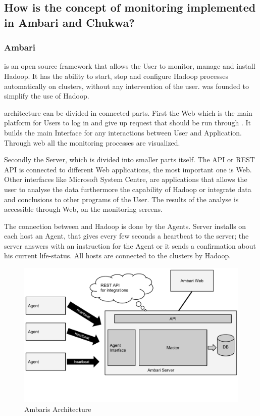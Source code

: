 \subsection{How is the concept of monitoring implemented in Ambari and Chukwa?}
\subsubsection{Ambari}
\amb is an open source framework that allows the User to monitor, manage and install Hadoop.\cite{ApacheSoftwareFoundation2015} It has the ability to start, stop and configure Hadoop processes automatically on clusters, without any intervention of the user.\cite{Hortonworks2013} \amb was founded to simplify the use of Hadoop.\cite{Hortonworks2013}

\amb architecture can be divided in connected parts. First the \amb Web which is the main platform for Users to log in and give up request that should be run through \amb.\cite{Sako} It builds the main Interface for any interactions between User and Application.\cite{Sako} Through \amb web all the monitoring processes are visualized. 

Secondly the \amb Server, which is divided into smaller parts itself.\cite{Sako} The API or REST API is connected to different Web applications, the most important one is \amb Web.\cite{Sako} Other interfaces like Microsoft System Centre, are applications that allows the user to analyse the data furthermore the capability of Hadoop or integrate data and conclusions to other programs of the User.\cite{Hortonworks2013} The results of the analyse is accessible through \amb Web, on the monitoring screens.\cite{Sako}

The connection between \amb and Hadoop is done by the \amb Agents.\cite{Sako} \amb Server installs on each host an \amb Agent, that gives every few seconds a heartbeat to the server; the server answers with an instruction for the Agent or it sends a confirmation about his current life-status.\cite{Sako} All hosts are connected to the clusters by Hadoop.\cite{Sako}

\begin{figure}[hbt]
  \centering
  \includegraphics[width=\linewidth,clip=true,trim=0 3cm 0 0]{images/AmbariArchitecture}
  \caption{Ambaris Architecture~\cite{Sako}}
  \label{fig:AmbariArchitecture}
\end{figure}

